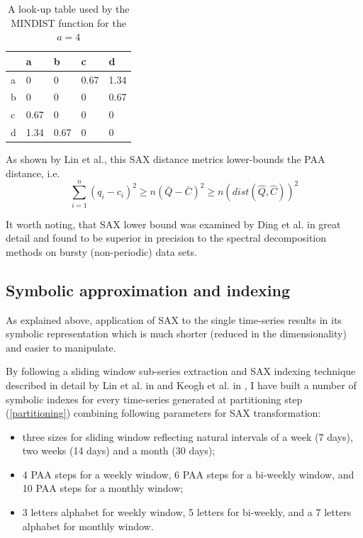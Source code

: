 \documentclass[conference]{worldcomp}
\begin{document}
\begin{table}
\begin{tabularx}{240pt}{X X X X X}
\hline
   & a   & b    & c    & d    \\
\hline
a & 0    & 0    & 0.67 & 1.34 \\
b & 0    & 0    & 0    & 0.67 \\
c & 0.67 & 0    & 0    & 0    \\
d & 1.34 & 0.67 & 0    & 0    \\
\hline
\end{tabularx}
\caption{A look-up table used by the MINDIST function for the $a=4$}
\label{tbl:sax_lookup}
\end{table}

As shown by Lin et al., this SAX distance metrics lower-bounds the PAA distance, i.e.
\begin{equation}
\sum_{i=1}^{n} (q_{i} - c_{i})^{2} \geq n(\bar{Q} - \bar{C})^{2} \geq n(dist(\hat{Q},\hat{C}))^2
\label{eq:sax_bounding}
\end{equation}

It worth noting, that SAX lower bound was examined by Ding et al. \cite{citeulike:4501572} in 
great detail and found to be superior in precision to the spectral decomposition methods 
on bursty (non-periodic) data sets.

\subsection{Symbolic approximation and indexing}
As explained above, application of SAX to the single time-series results in its symbolic 
representation which is much shorter (reduced in the dimensionality) and easier to manipulate. 

By following a sliding window sub-series extraction and SAX indexing technique described 
in detail by Lin et al. in \cite{citeulike:2821475} and Keogh et al. in 
\cite{citeulike:532335}, I have built a number of symbolic indexes for every time-series 
generated at partitioning step (\ref{partitioning}) combining following parameters for 
SAX transformation: 
\begin{itemize}
 \item three sizes for sliding window reflecting natural intervals of a week (7 days), 
      two weeks (14 days) and a month (30 days);
 \item 4 PAA steps for a weekly window, 6 PAA steps for a bi-weekly window,
      and 10 PAA steps for a monthly window;
 \item 3 letters alphabet for weekly window, 5 letters for bi-weekly,
      and a 7 letters alphabet for monthly window.
\end{itemize}
\end{document}
